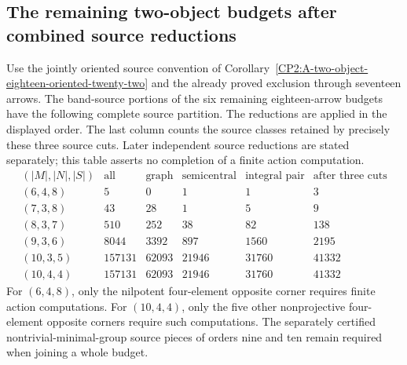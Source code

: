 \subsection{The remaining two-object budgets after combined source reductions}
\label{CP2:sec-combined-small-corners}

\begin{proposition}
\label{CP2:A-combined-small-corner-scope}
Use the jointly oriented source convention of
Corollary~\ref{CP2:A-two-object-eighteen-oriented-twenty-two} and the already proved
exclusion through seventeen arrows.  The band-source portions of the six
remaining eighteen-arrow budgets have the following complete source partition.
The reductions are applied in the displayed order.  The last column counts the source classes retained by precisely these
three source cuts. Later independent source reductions are stated separately;
this table asserts no completion of a finite action computation.
\[
\begin{array}{c|r|r|r|r|r}
(|M|,|N|,|S|)&\text{all}&\text{graph}&\text{semicentral}&
 \text{integral pair}&\text{after three cuts}\\\hline
(6,4,8)&5&0&1&1&3\\
(7,3,8)&43&28&1&5&9\\
(8,3,7)&510&252&38&82&138\\
(9,3,6)&8044&3392&897&1560&2195\\
(10,3,5)&157131&62093&21946&31760&41332\\
(10,4,4)&157131&62093&21946&31760&41332
\end{array}
\]
For $(6,4,8)$, only the nilpotent four-element opposite corner requires
finite action computations.  For $(10,4,4)$, only the five other
nonprojective four-element opposite corners require such computations.
The separately certified nontrivial-minimal-group source pieces of orders
nine and ten remain required when joining a whole budget.
\end{proposition}

